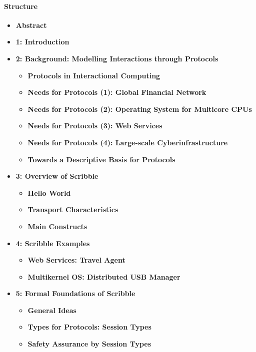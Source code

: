 \paragraph{Structure}
\begin{itemize}
    \item \textbf{Abstract}

    \item \textbf{1: Introduction}

    \item \textbf{2: Background: Modelling Interactions through Protocols}
    \begin{itemize}
        \item \textbf{Protocols in Interactional Computing}
        \item \textbf{Needs for Protocols (1): Global Financial Network}
        \item \textbf{Needs for Protocols (2): Operating System for Multicore CPUs}
        \item \textbf{Needs for Protocols (3): Web Services}
        \item \textbf{Needs for Protocols (4): Large-scale Cyberinfrastructure}
        \item \textbf{Towards a Descriptive Basis for Protocols}
    \end{itemize}

    \item \textbf{3: Overview of Scribble}
    \begin{itemize}
        \item \textbf{Hello World}
        \item \textbf{Transport Characteristics}
        \item \textbf{Main Constructs}
    \end{itemize}

    \item \textbf{4: Scribble Examples}
    \begin{itemize}
        \item \textbf{Web Services: Travel Agent}
        \item \textbf{Multikernel OS: Distributed USB Manager}
    \end{itemize}

    \item \textbf{5: Formal Foundations of Scribble}
    \begin{itemize}
        \item \textbf{General Ideas}
        \item \textbf{Types for Protocols: Session Types}
        \item \textbf{Safety Assurance by Session Types}
    \end{itemize}


\end{itemize}
